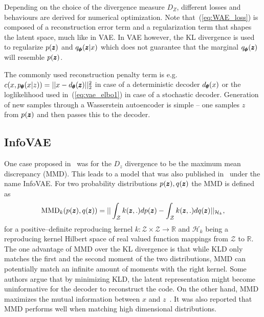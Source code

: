 Depending on the choice of the divergence measure $D_{Z}$, different
losses and behaviours are derived for numerical optimization. Note
that~(\ref{eq:WAE_loss}) is composed of a reconstruction error
term and a regularization term that shapes the latent space, much
like in VAE. In VAE however, the KL divergence is used to regularize
$p(\pmb{{z}})$ and $q_{\pmb{{\phi}}}(\pmb{{z}}|x)$ which does not guarantee that the marginal
$q_{\pmb{{\phi}}}(\pmb{{z}})$ will resemble $p(\pmb{{z}})$. 

The commonly used reconstruction penalty term is e.g. $c(x,p_{\pmb{{\theta}}}(x|z))=||x-d_{\pmb{{\theta}}}(\pmb{{z}})||_{2}^{2}$
in case of a deterministic decoder $d_{\pmb{{\theta}}}(x)$ or the loglikelihood
used in~(\ref{eq:vae_elbo1}) in case of a stochastic decoder. Generation
of new samples through a Wasserstein autoencoder is simple -- one
samples $z$ from $p(\pmb{{z}})$ and then passes this to the decoder.

\subsection{InfoVAE}

One case proposed in~\cite{tolstikhin2017wasserstein} was for the
$D_{z}$ divergence to be the maximum mean discrepancy (MMD). This
leads to a model that was also published in~\cite{zhao2017infovae}
under the name InfoVAE. For two probability distributions $p(\pmb{{z}}),q(\pmb{{z}})$
the MMD is defined as
\begin{equation}
\text{MMD}_{k}(p(\pmb{{z}}),q(\pmb{{z}}))=||\int_{\mathcal{Z}}k(\pmb{{z}},.)dp(\pmb{{z}})-\int_{\mathcal{Z}}k(\pmb{{z}},.)dq(\pmb{{z}})||_{\mathcal{H}_{k}},
\end{equation}
for a positive--definite reproducing kernel $k:\mathcal{Z}\times\mathcal{Z}\rightarrow\mathbb{R}$
and $\mathcal{H}_{k}$ being a reproducing kernel Hilbert space of
real valued function mappings from $\mathcal{Z}$ to $\mathbb{R}$.
The one advantage of MMD over the KL divergence is that while KLD
only matches the first and the second moment of the two distributions,
MMD can potentially match an infinite amount of moments with the right
kernel. Some authors argue that by minimizing KLD, the latent representation
might become uninformative for the decoder to reconstruct the code.
On the other hand, MMD maximizes the mutual information between $x$
and $z$~\cite{zhao2017infovae}. It was also reported that MMD
performs well when matching high dimensional distributions. 

